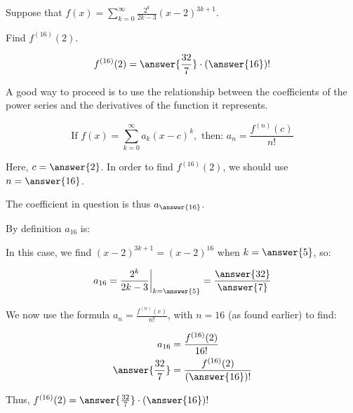 \documentclass{ximera}
\author{Jim Talamo}
\begin{document}
\begin{exercise}
Suppose that $f(x) = \sum_{k=0}^{\infty} \frac{2^k}{2k-3}(x-2)^{3k+1}$.

\begin{exercise}
Find $f^{(16)}(2)$.

\[
f^{(16)}(2) = \answer{\frac{32}{7}} \cdot \left(\answer{16}\right)! 
\]
\end{exercise}

\begin{hint}
A good way to proceed is to use the relationship between the coefficients of the power series and the derivatives of the function it represents.

\[
\textrm{If } f(x) = \sum_{k=0}^{\infty} a_k(x-c)^k, \textrm{ then: } a_n = \frac{f^{(n)}(c)}{n!}
\]

Here, $c=\answer{2}$.  In order to find $f^{(16)}(2)$, we should use $n=\answer{16}$.

The coefficient in question is thus $a_{\answer{16}}$.  

\begin{question}
By definition $a_{16}$ is:

\begin{multipleChoice}
\end{multipleChoice}

In this case, we find $(x-2)^{3k+1}=(x-2)^{16}$ when $k=\answer{5}$, so:

\[
a_{16} =  \frac{2^k}{2k-3} \bigg|_{k=\answer{5}} = \frac{\answer{32}}{\answer{7}}
\]

\begin{question}
We now use the formula $a_n = \frac{f^{(n)}(c)}{n!}$, with $n=16$ (as found earlier) to find:

\begin{align*}
a_{16} &= \frac{f^{(16)}(2)}{16!} \\
\answer{\frac{32}{7}} &= \frac{f^{(16)}(2)}{\left(\answer{16}\right)!}
\end{align*}

\begin{question}
Thus, $f^{(16)}(2) = \answer{\frac{32}{7}} \cdot \left(\answer{16}\right)! $

\end{question}
\end{question}
\end{question}

\end{hint}
 

\end{exercise}
\end{document}
